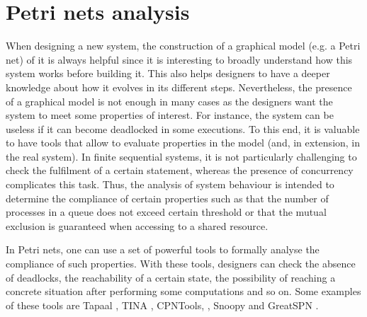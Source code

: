 %
%

\section{Petri nets analysis}
When designing a new system, the construction of a graphical model (e.g. a Petri net) of it is always
helpful since it is interesting to broadly understand how this system works before building it. This also helps designers to have a
deeper knowledge about how it evolves in its different steps. Nevertheless, the presence of a graphical model is not enough in many cases
as the designers want the system to meet some properties of interest. For instance, the system can be useless
if it can become deadlocked in some executions. To this end, it is valuable to have tools that allow to
evaluate properties in the model (and, in extension, in the real system). In finite sequential systems, 
it is not particularly challenging to check
the fulfilment of a certain statement, whereas the presence of concurrency complicates this task.
Thus, the analysis of system behaviour is intended to determine the compliance of 
certain properties such as that the number of processes in a queue does not exceed
certain threshold or that the mutual exclusion is guaranteed when accessing to a shared resource.

In Petri nets, one can use a set of powerful tools to formally analyse
the compliance of such properties. With these tools, designers can check
the absence of deadlocks, the reachability of a certain
state, the possibility of reaching a concrete situation after performing some computations and so on.
Some examples of these tools are Tapaal \cite{tapaal}, TINA \cite{TINA}, CPNTools, \cite{CPNTools}, Snoopy \cite{Snoopy} and GreatSPN \cite{GreatSPN}.

